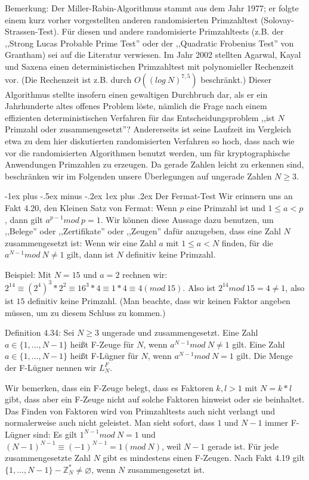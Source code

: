 \documentclass[a4paper]{article}
\makeatletter
\renewcommand{\subsubsection}{\@startsection{subsubsection}{3}{0mm}%
 {-1ex plus -.5ex minus -.2ex}%
 {1ex plus .2ex}%
 {\normalfont\small\bfseries}}
\makeatother
\begin{document}
\begin{multicols}{3}
        Bemerkung: Der Miller-Rabin-Algorithmus stammt aus dem Jahr 1977; er folgte einem kurz vorher vorgestellten anderen randomisierten Primzahltest (Solovay-Strassen-Test). Für diesen und andere randomisierte Primzahltests (z.B. der ,,Strong Lucas Probable Prime Test'' oder der ,,Quadratic Frobenius Test'' von Grantham) sei auf die Literatur verwiesen. Im Jahr 2002 stellten Agarwal, Kayal und Saxena einen deterministischen Primzahltest mit polynomieller Rechenzeit vor. (Die Rechenzeit ist z.B. durch $O((log\ N)^{7,5})$ beschränkt.) Dieser Algorithmus stellte insofern einen gewaltigen Durchbruch dar, als er ein Jahrhunderte altes offenes Problem löste, nämlich die Frage nach einem effizienten deterministischen Verfahren für das Entscheidungsproblem ,,ist $N$ Primzahl oder zusammengesetzt''? Andererseits ist seine Laufzeit im Vergleich etwa zu dem hier diskutierten randomisierten Verfahren so hoch, dass nach wie vor die randomisierten Algorithmen benutzt werden, um für kryptographische Anwendungen Primzahlen zu erzeugen.
        Da gerade Zahlen leicht zu erkennen sind, beschränken wir im Folgenden unsere Überlegungen auf ungerade Zahlen $N\geq 3$.

        \subsubsection{Der Fermat-Test}
        Wir erinnern uns an Fakt 4.20, den Kleinen Satz von Fermat: Wenn $p$ eine Primzahl ist und $1\leq a < p$, dann gilt $a^{p-1} mod\ p=1$.
        Wir können diese Aussage dazu benutzen, um ,,Belege'' oder ,,Zertifikate'' oder ,,Zeugen'' dafür anzugeben, dass eine Zahl $N$ zusammengesetzt ist: Wenn wir eine Zahl $a$ mit $1\leq a < N$ finden, für die $a^{N-1} mod\ N\not=1$ gilt, dann ist $N$ definitiv keine Primzahl.

        Beispiel: Mit $N=15$ und $a=2$ rechnen wir: $2^{14}\equiv (2^4)^3 * 2^2 \equiv 16^3*4 \equiv 1*4\equiv 4 (mod\ 15)$. Also ist $2^{14} mod\ 15 = 4\not= 1$, also ist $15$ definitiv keine Primzahl. (Man beachte, dass wir keinen Faktor angeben müssen, um zu diesem Schluss zu kommen.)

        Definition 4.34: Sei $N\geq 3$ ungerade und zusammengesetzt. Eine Zahl $a\in\{1,...,N-1\}$ heißt F-Zeuge für $N$, wenn $a^{N-1} mod\ N\not= 1$ gilt. Eine Zahl $a\in\{1,...,N-1\}$ heißt F-Lügner für $N$, wenn $a^{N-1} mod\ N=1$ gilt. Die Menge der F-Lügner nennen wir $L^F_N$.

        Wir bemerken, dass ein F-Zeuge belegt, dass es Faktoren $k,l >1$ mit $N=k*l$ gibt, dass aber ein F-Zeuge nicht auf solche Faktoren hinweist oder sie beinhaltet. Das Finden von Faktoren wird von Primzahltests auch nicht verlangt und normalerweise auch nicht geleistet.
        Man sieht sofort, dass $1$ und $N-1$ immer F-Lügner sind: Es gilt $1^{N-1} mod\ N=1$ und $(N-1)^{N-1} \equiv (-1)^{N-1}=1 (mod\ N)$, weil $N-1$ gerade ist.
        Für jede zusammengesetzte Zahl $N$ gibt es mindestens einen F-Zeugen. Nach Fakt 4.19 gilt $\{1,...,N-1\}-\mathbb{Z}^*_N\not=\varnothing$, wenn $N$ zusammengesetzt ist.


\end{multicols}
\end{document}
